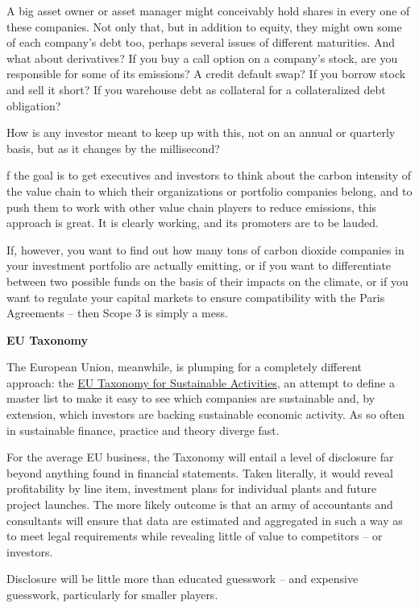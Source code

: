 \documentclass[
]{book}
\begin{document}
A big asset owner or asset manager might conceivably hold shares in every one of these companies. Not only that, but in addition to equity, they might own some of each company's debt too, perhaps several issues of different maturities. And what about derivatives? If you buy a call option on a company's stock, are you responsible for some of its emissions? A credit default swap? If you borrow stock and sell it short? If you warehouse debt as collateral for a collateralized debt obligation?

How is any investor meant to keep up with this, not on an annual or quarterly basis, but as it changes by the millisecond?

f the goal is to get executives and investors to think about the carbon intensity of the value chain to which their organizations or portfolio companies belong, and to push them to work with other value chain players to reduce emissions, this approach is great. It is clearly working, and its promoters are to be lauded.

If, however, you want to find out how many tons of carbon dioxide companies in your investment portfolio are actually emitting, or if you want to differentiate between two possible funds on the basis of their impacts on the climate, or if you want to regulate your capital markets to ensure compatibility with the Paris Agreements -- then Scope 3 is simply a mess.

\textbf{EU Taxonomy}

The European Union, meanwhile, is plumping for a completely different approach: the \href{https://ec.europa.eu/info/business-economy-euro/banking-and-finance/sustainable-finance/eu-taxonomy-sustainable-activities_en}{EU Taxonomy for Sustainable Activities}, an attempt to define a master list to make it easy to see which companies are sustainable and, by extension, which investors are backing sustainable economic activity. As so often in sustainable finance, practice and theory diverge fast.

For the average EU business, the Taxonomy will entail a level of disclosure far beyond anything found in financial statements. Taken literally, it would reveal profitability by line item, investment plans for individual plants and future project launches. The more likely outcome is that an army of accountants and consultants will ensure that data are estimated and aggregated in such a way as to meet legal requirements while revealing little of value to competitors -- or investors.

Disclosure will be little more than educated guesswork --
and expensive guesswork, particularly for smaller players.
\end{document}
